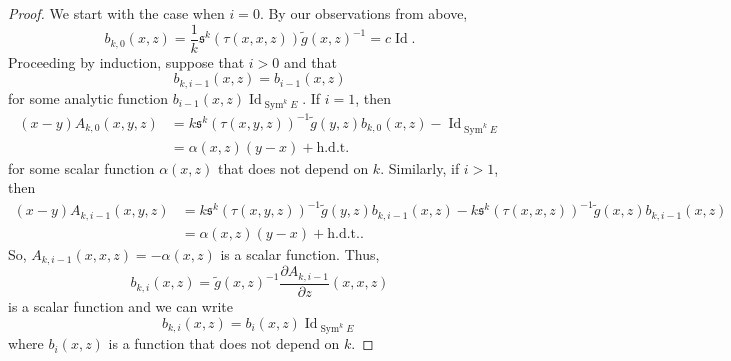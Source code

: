 \documentclass[10pt,a4paper]{amsart}
\DeclareMathOperator{\Id}{Id}
\DeclareMathOperator{\Sym}{Sym}
\newcommand{\deriv}[2]{\frac{\partial #1}{\partial #2}}
\begin{document}
\begin{proof}
We start with the case when $i = 0$. By our observations from above,
\begin{equation*}
    b_{k,0}(x,z)  = \frac{1}{k} \mathfrak{s}^k(\tau(x,x,z)) \tilde{g}(x,z)^{-1} = c  \Id.
\end{equation*}
Proceeding by induction, suppose that $i > 0$ and that \begin{equation*}
    b_{k,i-1} (x,z) = b_{i-1}(x,z)
\end{equation*}
for some analytic function $b_{i-1}(x,z) \Id_{\Sym^k E}$. If $i = 1$, then
\begin{equation*}
\begin{split}
    (x-y)A_{k,0}(x,y,z) & = k \mathfrak{s}^k(\tau(x,y,z))^{-1} \tilde{g}(y,z) b_{k,0}(x,z) - \Id_{\Sym^k E}  \\
    & = \alpha(x,z) (y-x) + \text{h.d.t.}
\end{split}
\end{equation*}
for some scalar function $\alpha(x,z)$ that does not depend on $k$. Similarly, if $i > 1$, then
\begin{equation*}
\begin{split}
    (x-y) A_{k,i-1}(x,y,z) & = k \mathfrak{s}^k(\tau(x,y,z))^{-1} \tilde{g}(y,z) b_{k,i-1}(x,z)  -  k \mathfrak{s}^k(\tau(x,x,z))^{-1} \tilde{g}(x,z) b_{k,i-1}(x,z)\\
    & = \alpha(x,z) (y-x) + \text{h.d.t.}.
\end{split}
\end{equation*}
So, $A_{k,i-1}(x,x,z) = -\alpha(x,z)$ is a scalar function. Thus,
\begin{equation*}
b_{k,i}(x,z) = \tilde{g}(x,z)^{-1} \deriv{A_{k,i-1}}{z}(x,x,z)
\end{equation*}
is a scalar function and we can write
$$
b_{k,i}(x,z) = b_i(x,z) \Id_{\Sym^k E}
$$
where $b_i(x,z)$ is a function that does not depend on $k$.


\end{proof}
\end{document}
